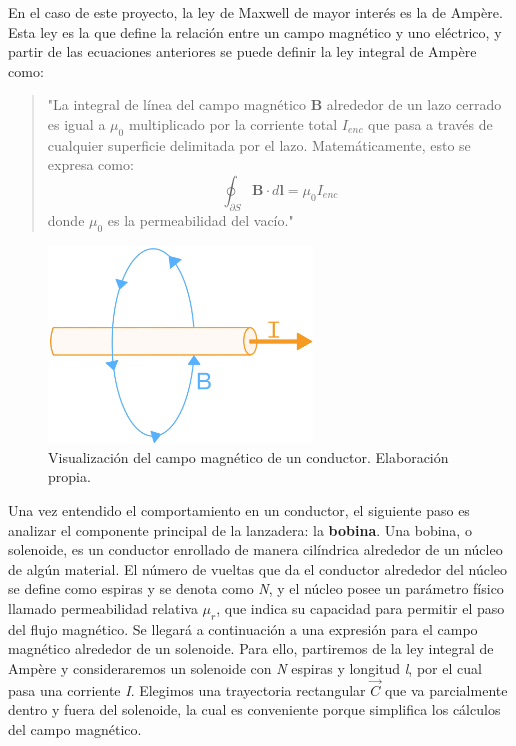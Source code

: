 En el caso de este proyecto, la ley de Maxwell de mayor interés es la de Ampère. Esta ley es la que define la relación entre un campo magnético y uno eléctrico, y partir de las ecuaciones anteriores se puede definir la ley integral de Ampère como:

\begin{quote}
    "La integral de línea del campo magnético \(\mathbf{B}\) alrededor de un lazo cerrado es igual a \(\mu_0\) multiplicado por la corriente total \(I_{enc}\) que pasa a través de cualquier superficie delimitada por el lazo. Matemáticamente, esto se expresa como:
    \[
    \oint_{\partial S} \mathbf{B} \cdot d\mathbf{l} = \mu_0 I_{enc}
    \]
    donde \(\mu_0\) es la permeabilidad del vacío."
\end{quote}

\begin{figure}[H]
    \centering %
    \includegraphics[width=7cm]{FigurasMemoria/amperelaw.jpg}
    \caption{Visualización del campo magnético de un conductor. Elaboración propia.}
    \label{fig:amperelaw} %
\end{figure}

Una vez entendido el comportamiento en un conductor, el siguiente paso es analizar el componente principal de la lanzadera: la \textbf{bobina}. Una bobina, o solenoide, es un conductor enrollado de manera cilíndrica alrededor de un núcleo de algún material. El número de vueltas que da el conductor alrededor del núcleo se define como espiras y se denota como \textit{N}, y el núcleo posee un parámetro físico llamado permeabilidad relativa \textit{\(\mu_r\)}, que indica su capacidad para permitir el paso del flujo magnético. Se llegará a continuación a una expresión para el campo magnético alrededor de un solenoide. Para ello, partiremos de la ley integral de Ampère y consideraremos un solenoide con \textit{N} espiras y longitud \textit{l}, por el cual pasa una corriente \textit{I}. Elegimos una trayectoria rectangular \(\vec{C}\) que va parcialmente dentro y fuera del solenoide, la cual es conveniente porque simplifica los cálculos del campo magnético.

